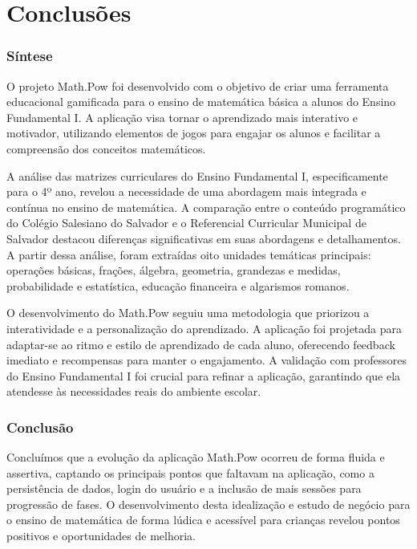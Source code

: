 \chapter{Conclusões}\label{chp:conc}

\subsection{Síntese} 

O projeto Math.Pow foi desenvolvido com o objetivo de criar uma ferramenta educacional gamificada para o ensino de matemática básica a alunos do Ensino Fundamental I. A aplicação visa tornar o aprendizado mais interativo e motivador, utilizando elementos de jogos para engajar os alunos e facilitar a compreensão dos conceitos matemáticos.

A análise das matrizes curriculares do Ensino Fundamental I, especificamente para o 4º ano, revelou a necessidade de uma abordagem mais integrada e contínua no ensino de matemática. A comparação entre o conteúdo programático do Colégio Salesiano do Salvador e o Referencial Curricular Municipal de Salvador destacou diferenças significativas em suas abordagens e detalhamentos. A partir dessa análise, foram extraídas oito unidades temáticas principais: operações básicas, frações, álgebra, geometria, grandezas e medidas, probabilidade e estatística, educação financeira e algarismos romanos.

O desenvolvimento do Math.Pow seguiu uma metodologia que priorizou a interatividade e a personalização do aprendizado. A aplicação foi projetada para adaptar-se ao ritmo e estilo de aprendizado de cada aluno, oferecendo feedback imediato e recompensas para manter o engajamento. A validação com professores do Ensino Fundamental I foi crucial para refinar a aplicação, garantindo que ela atendesse às necessidades reais do ambiente escolar.

\subsection{Conclusão}

Concluímos que a evolução da aplicação Math.Pow ocorreu de forma fluida e assertiva, captando os principais pontos que faltavam na aplicação, como a persistência de dados, login do usuário e a inclusão de mais sessões para progressão de fases. O desenvolvimento desta idealização e estudo de negócio para o ensino de matemática de forma lúdica e acessível para crianças revelou pontos positivos e oportunidades de melhoria.

